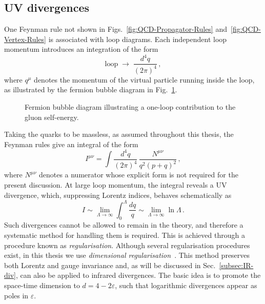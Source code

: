 \subsection{UV divergences}
\label{subsec:UV-div}

One Feynman rule not shown in
Figs.~\ref{fig:QCD-Propagator-Rules} and~\ref{fig:QCD-Vertex-Rules}
is associated with loop diagrams. Each independent loop momentum
introduces an integration of the form
\begin{equation}
    \mathrm{loop} \;\longrightarrow\; \frac{d^4q}{(2\pi)^4}\,,
\end{equation}
where $q^\mu$ denotes the momentum of the virtual particle running inside the loop, as
illustrated by the fermion bubble diagram in Fig.~\ref{fig:fermion-bubble}.

\begin{figure}[h]
\centering
{}
\caption{Fermion bubble diagram illustrating a one-loop contribution 
to the gluon self-energy.}
\label{fig:fermion-bubble}
\end{figure}

Taking the quarks to be massless, as assumed throughout this thesis, the Feynman
rules give an integral of the form
\begin{equation}
    I^{\mu\nu} = \int \frac{d^4q}{(2\pi)^4} \, \frac{N^{\mu\nu}}{q^2 (p+q)^2}\,,
\end{equation}
where $N^{\mu\nu}$ denotes a numerator whose explicit form is not required for the present
discussion. At large loop momentum, the integral reveals a UV divergence, which, suppressing Lorentz indices, behaves schematically as
\begin{equation}
    I\sim \lim_{\Lambda \to \infty} \int_0^\Lambda \frac{dq}{q}
      \sim \lim_{\Lambda \to \infty} \ln \Lambda\,.
\end{equation}
Such divergences cannot be allowed to remain in the theory, 
and therefore a systematic method for handling them is required. 
This is achieved through a procedure known as \emph{regularisation}. 
Although several regularisation procedures exist, in this thesis we use \emph{dimensional regularisation}~\cite{tHooft:1972tcz, Bollini:1972ui}. This method preserves both Lorentz and gauge invariance and, as will be discussed in Sec.~\ref{subsec:IR-div}, can also be applied to infrared divergences. The basic idea is to promote the space-time dimension to $d = 4 - 2\varepsilon$, such that 
logarithmic divergences appear as poles in $\varepsilon$. 

